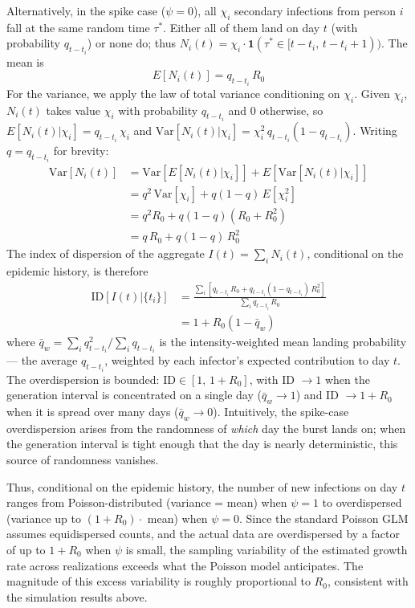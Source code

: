 Alternatively, in the spike case ($\psi = 0$), all $\chi_i$ secondary infections from person $i$ fall at the same random time $\tau^*$. Either all of them land on day $t$ (with probability $q_{t-t_i}$) or none do; thus $N_i(t) = \chi_i \cdot \mathbf{1}(\tau^* \in [t-t_i,\, t-t_i+1))$. The mean is
\begin{equation}
	E[N_i(t)] = q_{t-t_i} \, R_0
\end{equation}
For the variance, we apply the law of total variance conditioning on $\chi_i$. Given $\chi_i$, $N_i(t)$ takes value $\chi_i$ with probability $q_{t-t_i}$ and $0$ otherwise, so $E[N_i(t)|\chi_i] = q_{t-t_i}\,\chi_i$ and $\text{Var}[N_i(t)|\chi_i] = \chi_i^2\,q_{t-t_i}(1-q_{t-t_i})$. Writing $q = q_{t-t_i}$ for brevity:
\begin{align}
	\text{Var}[N_i(t)] &= \text{Var}[E[N_i(t) | \chi_i]] + E[\text{Var}[N_i(t) | \chi_i]] \\
	&= q^2\,\text{Var}[\chi_i] + q(1-q)\,E[\chi_i^2] \\
	&= q^2 R_0 + q(1-q)(R_0 + R_0^2) \\
	&= q\,R_0 + q(1-q)\,R_0^2
\end{align}
The index of dispersion of the aggregate $I(t) = \sum_i N_i(t)$, conditional on the epidemic history, is therefore
\begin{align}
	\text{ID}[I(t) | \{t_i\}] &= \frac{\sum_i \left[q_{t-t_i}\,R_0 + q_{t-t_i}(1-q_{t-t_i})\,R_0^2\right]}{\sum_i q_{t-t_i}\,R_0} \\
	&= 1 + R_0\!\left(1 - \bar{q}_w\right)
\end{align}
where $\bar{q}_w = \sum_i q_{t-t_i}^2 \big/ \sum_i q_{t-t_i}$ is the intensity-weighted mean landing probability --- the average $q_{t-t_i}$, weighted by each infector's expected contribution to day $t$. The overdispersion is bounded: $\text{ID} \in [1,\, 1 + R_0]$, with ID $\to 1$ when the generation interval is concentrated on a single day ($\bar{q}_w \to 1$) and ID $\to 1 + R_0$ when it is spread over many days ($\bar{q}_w \to 0$). Intuitively, the spike-case overdispersion arises from the randomness of \emph{which} day the burst lands on; when the generation interval is tight enough that the day is nearly deterministic, this source of randomness vanishes.

Thus, conditional on the epidemic history, the number of new infections on day $t$ ranges from Poisson-distributed (variance = mean) when $\psi = 1$ to overdispersed (variance up to $(1 + R_0) \cdot$ mean) when $\psi = 0$. Since the standard Poisson GLM assumes equidispersed counts, and the actual data are overdispersed by a factor of up to $1 + R_0$ when $\psi$ is small, the sampling variability of the estimated growth rate across realizations exceeds what the Poisson model anticipates. The magnitude of this excess variability is roughly proportional to $R_0$, consistent with the simulation results above.

